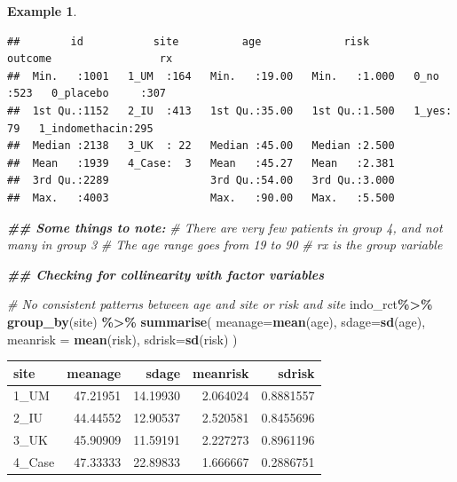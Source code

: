 \documentclass[
  openany]{book}
\newenvironment{Shaded}{\begin{snugshade}}{\end{snugshade}}
\newcommand{\AttributeTok}[1]{\textcolor[rgb]{0.13,0.29,0.53}{#1}}
\newcommand{\CommentTok}[1]{\textcolor[rgb]{0.56,0.35,0.01}{\textit{#1}}}
\newcommand{\DocumentationTok}[1]{\textcolor[rgb]{0.56,0.35,0.01}{\textbf{\textit{#1}}}}
\newcommand{\FunctionTok}[1]{\textcolor[rgb]{0.13,0.29,0.53}{\textbf{#1}}}
\newcommand{\NormalTok}[1]{#1}
\newcommand{\SpecialCharTok}[1]{\textcolor[rgb]{0.81,0.36,0.00}{\textbf{#1}}}
\theoremstyle{definition}
\theoremstyle{definition}
\newtheorem{example}{Example}[chapter]
\theoremstyle{definition}
\theoremstyle{definition}
\theoremstyle{remark}
\begin{document}
\begin{example}
\begin{verbatim}
##        id           site          age             risk        outcome                 rx     
##  Min.   :1001   1_UM  :164   Min.   :19.00   Min.   :1.000   0_no :523   0_placebo     :307  
##  1st Qu.:1152   2_IU  :413   1st Qu.:35.00   1st Qu.:1.500   1_yes: 79   1_indomethacin:295  
##  Median :2138   3_UK  : 22   Median :45.00   Median :2.500                                   
##  Mean   :1939   4_Case:  3   Mean   :45.27   Mean   :2.381                                   
##  3rd Qu.:2289                3rd Qu.:54.00   3rd Qu.:3.000                                   
##  Max.   :4003                Max.   :90.00   Max.   :5.500
\end{verbatim}

\begin{Shaded}
\begin{Highlighting}[]
\DocumentationTok{\#\# Some things to note:}
\CommentTok{\# There are very few patients in group 4, and not many in group 3}
\CommentTok{\# The age range goes from 19 to 90 }
\CommentTok{\# \textquotesingle{}rx\textquotesingle{} is the group variable}

\DocumentationTok{\#\# Checking for collinearity with factor variables}

\CommentTok{\# No consistent patterns between age and site or risk and site}
\NormalTok{indo\_rct}\SpecialCharTok{\%\textgreater{}\%}
  \FunctionTok{group\_by}\NormalTok{(site) }\SpecialCharTok{\%\textgreater{}\%} 
  \FunctionTok{summarise}\NormalTok{(}
    \AttributeTok{meanage=}\FunctionTok{mean}\NormalTok{(age), }\AttributeTok{sdage=}\FunctionTok{sd}\NormalTok{(age),}
    \AttributeTok{meanrisk =} \FunctionTok{mean}\NormalTok{(risk), }\AttributeTok{sdrisk=}\FunctionTok{sd}\NormalTok{(risk)}
\NormalTok{    )}
\end{Highlighting}
\end{Shaded}

\begin{tabular}{l|r|r|r|r}
\hline
site & meanage & sdage & meanrisk & sdrisk\\
\hline
1\_UM & 47.21951 & 14.19930 & 2.064024 & 0.8881557\\
\hline
2\_IU & 44.44552 & 12.90537 & 2.520581 & 0.8455696\\
\hline
3\_UK & 45.90909 & 11.59191 & 2.227273 & 0.8961196\\
\hline
4\_Case & 47.33333 & 22.89833 & 1.666667 & 0.2886751\\
\hline
\end{tabular}


\end{example}
\end{document}
